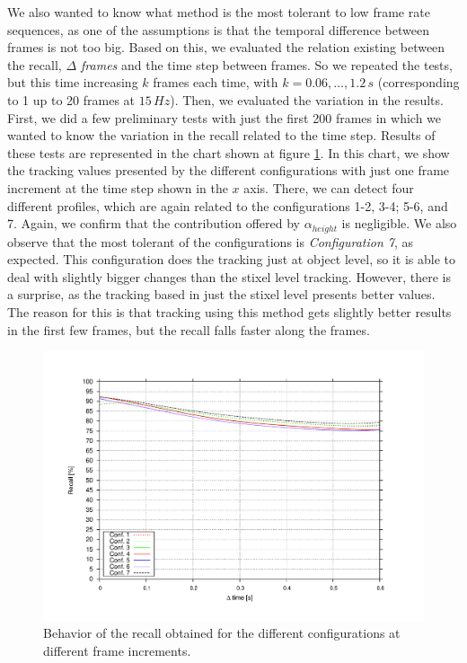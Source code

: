 We also wanted to know what method is the most tolerant to low frame rate sequences, as one of the assumptions is that the temporal difference between frames is not too big. Based on this, we evaluated the relation existing between the recall, \emph{$\Delta$ frames} and the time step between frames. So we repeated the tests, but this time increasing $k$ frames each time, with $k=0.06,\dots,1.2\,s$ (corresponding to 1 up to 20 frames at $15\,Hz$). Then, we evaluated the variation in the results. First, we did a few preliminary tests with just the first 200 frames in which we wanted to know the variation in the recall related to the time step. Results of these tests are represented in the chart shown at figure \ref{fig:cp04_recall_vs_step}. In this chart, we show the tracking values presented by the different configurations with just one frame increment at the time step shown in the $x$ axis. There, we can detect four different profiles, which are again related to the configurations 1-2, 3-4; 5-6, and 7. Again, we confirm that the contribution offered by $\alpha_{height}$ is negligible. We also observe that the most tolerant of the configurations is \emph{Configuration 7}, as expected. This configuration does the tracking just at object level, so it is able to deal with slightly bigger changes than the stixel level tracking. However, there is a surprise, as the tracking based in just the stixel level presents better values. The reason for this is that tracking using this method gets slightly better results in the first few frames, but the recall falls faster along the frames.

\begin{figure}[t]
\centering
\includegraphics[width=\textwidth,height=0.5\textwidth,trim=50 40 80 60,clip]{recall_vs_step}
\caption{Behavior of the recall obtained for the different configurations at different frame increments.}\label{fig:cp04_recall_vs_step}
\end{figure}

